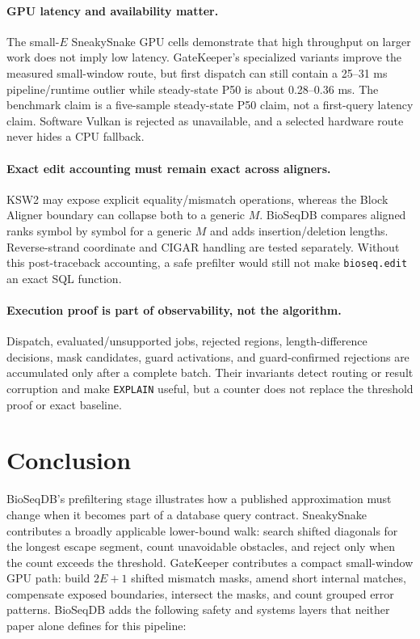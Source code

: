 \paragraph{GPU latency and availability matter.}
The small-\(E\) SneakySnake GPU cells demonstrate that high throughput on
larger work does not imply low latency.  GateKeeper's specialized variants
improve the measured small-window route, but first dispatch can still contain a
25--31 ms pipeline/runtime outlier while steady-state P50 is about
0.28--0.36 ms.  The benchmark claim is a five-sample steady-state P50 claim,
not a first-query latency claim.  Software Vulkan is rejected as unavailable,
and a selected hardware route never hides a CPU fallback.

\paragraph{Exact edit accounting must remain exact across aligners.}
KSW2 may expose explicit equality/mismatch operations, whereas the Block
Aligner boundary can collapse both to a generic \(M\).  BioSeqDB compares
aligned ranks symbol by symbol for a generic \(M\) and adds insertion/deletion
lengths.  Reverse-strand coordinate and CIGAR handling are tested separately.
Without this post-traceback accounting, a safe prefilter would still not make
\texttt{bioseq.edit} an exact SQL function.

\paragraph{Execution proof is part of observability, not the algorithm.}
Dispatch, evaluated/unsupported jobs, rejected regions, length-difference
decisions, mask candidates, guard activations, and guard-confirmed rejections
are accumulated only after a complete batch.  Their invariants detect routing
or result corruption and make \texttt{EXPLAIN} useful, but a counter does not
replace the threshold proof or exact baseline.

\section{Conclusion}

BioSeqDB's prefiltering stage illustrates how a published approximation must
change when it becomes part of a database query contract.  SneakySnake
contributes a broadly applicable lower-bound walk: search shifted diagonals for
the longest escape segment, count unavoidable obstacles, and reject only when
the count exceeds the threshold.  GateKeeper contributes a compact small-window
GPU path: build \(2E+1\) shifted mismatch masks, amend short internal matches,
compensate exposed boundaries, intersect the masks, and count grouped error
patterns.  BioSeqDB adds the following safety and systems layers that neither
paper alone defines for this pipeline:

